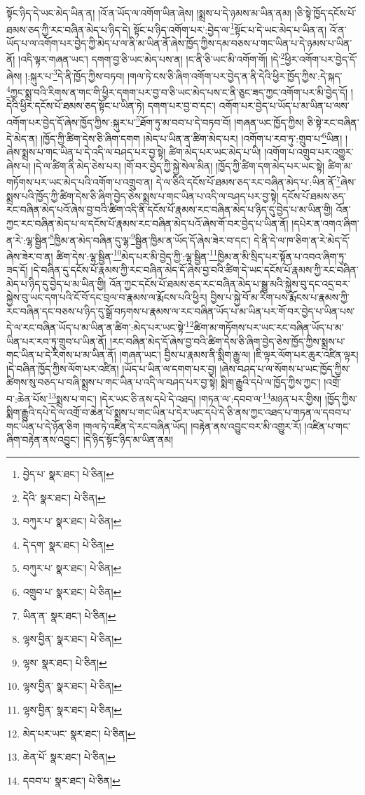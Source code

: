 སྟོང་ཉིད་དེ་ཡང་མེད་ཡིན་ན། །འོ་ན་ཡོད་ལ་འགོག་ཡིན་ཞེས། །སྨྲས་པ་དེ་ཉམས་མ་ཡིན་ནམ། །ཅི་སྟེ་ཁྱོད་དངོས་པོ་ཐམས་ཅད་ཀྱི་རང་བཞིན་མེད་པ་ཉིད་དེ། སྟོང་པ་ཉིད་འགོག་པར་:བྱེད་ལ་\footnote{བྱེད་པ་  སྣར་ཐང་།  པེ་ཅིན། }སྟོང་པ་དེ་ཡང་མེད་པ་ཡིན་ན། འོ་ན་ཡོད་པ་ལ་འགོག་པར་བྱེད་ཀྱི་མེད་པ་ལ་ནི་མ་ཡིན་ནོ་ཞེས་ཁྱོད་ཀྱིས་དམ་བཅས་པ་གང་ཡིན་པ་དེ་ཉམས་པ་ཡིན་ནོ། །འདི་ལྟར་གཞན་ཡང་། དགག་བྱ་ཅི་ཡང་མེད་པས་ན། །ང་ནི་ཅི་ཡང་མི་འགོག་གོ། །དེ་\footnote{དེའི་  སྣར་ཐང་།  པེ་ཅིན། }ཕྱིར་འགོག་པར་བྱེད་དོ་ཞེས། །:སྐུར་པ་\footnote{བཀུར་པ་  སྣར་ཐང་།  པེ་ཅིན། }དེ་ནི་ཁྱོད་ཀྱིས་བཏབ། །གལ་ཏེ་ངས་ཅི་ཞིག་འགོག་པར་བྱེད་ན་ནི་དེའི་ཕྱིར་ཁྱོད་ཀྱིས་:དེ་སྐད་\footnote{དེ་དག་  སྣར་ཐང་།  པེ་ཅིན། }ཀྱང་སྨྲ་བའི་རིགས་ན་གང་གི་ཕྱིར་དགག་པར་བྱ་བ་ཅི་ཡང་མེད་པས་ང་ནི་ཅུང་ཟད་ཀྱང་འགོག་པར་མི་བྱེད་དོ། །དེའི་ཕྱིར་དངོས་པོ་ཐམས་ཅད་སྟོང་པ་ཡིན་ཏེ། དགག་པར་བྱ་བ་དང་། འགོག་པར་བྱེད་པ་ཡོད་པ་མ་ཡིན་པ་ལས་འགོག་པར་བྱེད་དོ་ཞེས་ཁྱོད་ཀྱིས་:སྐུར་པ་\footnote{བཀུར་པ་  སྣར་ཐང་།  པེ་ཅིན། }ཐོག་ཏུ་མ་བབ་པ་དེ་བཏབ་བོ། །གཞན་ཡང་ཁྱོད་ཀྱིས། ཅི་སྟེ་རང་བཞིན་དེ་མེད་ན། །ཁྱོད་ཀྱི་ཚིག་དེས་ཅི་ཞིག་དགག །མེད་པ་ཡིན་ན་ཚིག་མེད་པར། །འགོག་པ་རབ་ཏུ་:གྲུབ་པ་\footnote{འགྲུབ་པ་  སྣར་ཐང་།  པེ་ཅིན། }ཡིན། །ཞེས་སྨྲས་པ་གང་ཡིན་པ་དེ་འདི་ལ་བཤད་པར་བྱ་སྟེ། ཚིག་མེད་པར་ཡང་མེད་པ་ཡི། །འགོག་པ་འགྲུབ་པར་འགྱུར་ཞེས་པ། །དེ་ལ་ཚིག་ནི་མེད་ཅེས་པར། །གོ་བར་བྱེད་ཀྱི་སྐྱེ་སེལ་མིན། །ཁྱོད་ཀྱི་ཚིག་དག་མེད་པར་ཡང་སྟེ། ཚིག་མ་གཏོགས་པར་ཡང་མེད་པའི་འགོག་པ་འགྲུབ་ན། དེ་ལ་ཅིའི་དངོས་པོ་ཐམས་ཅད་རང་བཞིན་མེད་པ་:ཡིན་ནོ་\footnote{ཡིན་ན་  སྣར་ཐང་།  པེ་ཅིན། }ཞེས་སྨྲས་པའི་ཁྱོད་ཀྱི་ཚིག་དེས་ཅི་ཞིག་བྱེད་ཅེས་སྨྲས་པ་གང་ཡིན་པ་འདི་ལ་བཤད་པར་བྱ་སྟེ། དངོས་པོ་ཐམས་ཅད་རང་བཞིན་མེད་པའོ་ཞེས་བྱ་བའི་ཚིག་འདི་ནི་དངོས་པོ་རྣམས་རང་བཞིན་མེད་པ་ཉིད་དུ་བྱེད་པ་མ་ཡིན་གྱི། འོན་ཀྱང་རང་བཞིན་མེད་པ་ལ་དངོས་པོ་རྣམས་རང་བཞིན་མེད་པའོ་ཞེས་གོ་བར་བྱེད་པ་ཡིན་ནོ། །དཔེར་ན་འགའ་ཞིག་ན་རེ་:ལྷ་སྦྱིན་\footnote{ལྷས་བྱིན་  སྣར་ཐང་།  པེ་ཅིན། }ཁྱིམ་ན་མེད་བཞིན་དུ་ལྷ་\footnote{ལྷས་  སྣར་ཐང་།  པེ་ཅིན། }སྦྱིན་ཁྱིམ་ན་ཡོད་དོ་ཞེས་ཟེར་བ་དང་། དེ་ནི་དེ་ལ་ཁ་ཅིག་ན་རེ་མེད་དོ་ཞེས་ཟེར་བ་ན། ཚིག་དེས་:ལྷ་སྦྱིན་\footnote{ལྷས་བྱིན་  སྣར་ཐང་།  པེ་ཅིན། }མེད་པར་མི་བྱེད་ཀྱི་:ལྷ་སྦྱིན་\footnote{ལྷས་བྱིན་  སྣར་ཐང་།  པེ་ཅིན། }ཁྱིམ་ན་མི་སྲིད་པར་སྟོན་པ་འབའ་ཞིག་ཏུ་ཟད་དོ། །དེ་བཞིན་དུ་དངོས་པོ་རྣམས་ཀྱི་རང་བཞིན་མེད་དོ་ཞེས་བྱ་བའི་ཚིག་དེ་ཡང་དངོས་པོ་རྣམས་ཀྱི་རང་བཞིན་མེད་པ་ཉིད་དུ་བྱེད་པ་མ་ཡིན་གྱི། འོན་ཀྱང་དངོས་པོ་ཐམས་ཅད་རང་བཞིན་མེད་པ་སྒྱུ་མའི་སྐྱེས་བུ་དང་འདྲ་བར་སྐྱེས་བུ་ཡང་དག་པའི་ངོ་བོ་དང་བྲལ་བ་རྣམས་ལ་རྨོངས་པའི་ཕྱིར། བྱིས་པ་སྐྱེ་བོ་མ་རིག་པས་རྨོངས་པ་རྣམས་ཀྱི་རང་བཞིན་དང་བཅས་པ་ཉིད་དུ་སྒྲོ་བཏགས་པ་རྣམས་ལ་རང་བཞིན་ཡོད་པ་མ་ཡིན་པར་གོ་བར་བྱེད་པ་ཡིན་པས་དེ་ལ་རང་བཞིན་ཡོད་པ་མ་ཡིན་ན་ཚིག་:མེད་པར་ཡང་སྟེ་\footnote{མེད་པར་ཡང་  སྣར་ཐང་།  པེ་ཅིན། }ཚིག་མ་གཏོགས་པར་ཡང་རང་བཞིན་ཡོད་པ་མ་ཡིན་པར་རབ་ཏུ་གྲུབ་པ་ཡིན་ནོ། །རང་བཞིན་མེད་དོ་ཞེས་བྱ་བའི་ཚིག་དེས་ཅི་ཞིག་བྱེད་ཅེས་ཁྱོད་ཀྱིས་སྨྲས་པ་གང་ཡིན་པ་དེ་རིགས་པ་མ་ཡིན་ནོ། །གཞན་ཡང་། བྱིས་པ་རྣམས་ནི་སྨིག་རྒྱུ་ལ། །ཇི་ལྟར་ལོག་པར་ཆུར་འཛིན་ལྟར། །དེ་བཞིན་ཁྱོད་ཀྱིས་ལོག་པར་འཛིན། །ཡོད་པ་ཡིན་ལ་དགག་པར་བྱ། །ཞེས་བཤད་པ་ལ་སོགས་པ་ཡང་ཁྱོད་ཀྱིས་ཚིགས་སུ་བཅད་པ་བཞི་སྨྲས་པ་གང་ཡིན་པ་འདི་ལ་བཤད་པར་བྱ་སྟེ། སྨིག་རྒྱུའི་དཔེ་ལ་ཁྱོད་ཀྱིས་ཀྱང་། །འགྲོ་བ་:ཆེན་པོས་\footnote{ཆེན་པོ་  སྣར་ཐང་།  པེ་ཅིན། }སྨྲས་པ་གང་། །དེར་ཡང་ཅི་ནས་དཔེ་དེ་འཐད། །གཏན་ལ་:དབབ་ལ་\footnote{དབབ་པ་  སྣར་ཐང་།  པེ་ཅིན། }མཉན་པར་གྱིས། །ཁྱོད་ཀྱིས་སྨིག་རྒྱུའི་དཔེ་དེ་ལ་འགྲོ་བ་ཆེན་པོ་སྨྲས་པ་གང་ཡིན་པ་དེར་ཡང་དཔེ་དེ་ཅི་ནས་ཀྱང་འཐད་པ་གཏན་ལ་དབབ་པ་གང་ཡིན་པ་དེ་ཉོན་ཅིག །གལ་ཏེ་འཛིན་དེ་རང་བཞིན་ཡོད། །བརྟེན་ནས་འབྱུང་བར་མི་འགྱུར་རོ། །འཛིན་པ་གང་ཞིག་བརྟེན་ནས་འབྱུང་། །དེ་ཉིད་སྟོང་ཉིད་མ་ཡིན་ནམ། 